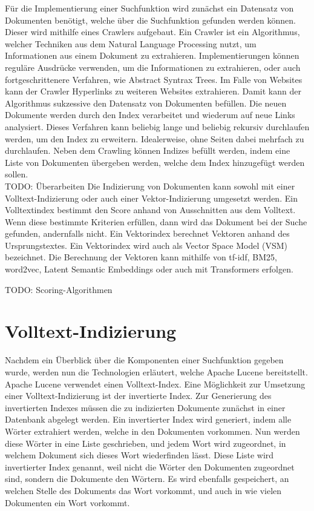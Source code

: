 Für die Implementierung einer Suchfunktion wird zunächst ein Datensatz von Dokumenten benötigt, welche über die Suchfunktion gefunden werden können.
Dieser wird mithilfe eines Crawlers aufgebaut.
Ein Crawler ist ein Algorithmus, welcher Techniken aus dem Natural Language Processing nutzt, um Informationen aus einem Dokument zu extrahieren.\cite{Khder_2021}
Implementierungen können reguläre Ausdrücke verwenden, um die Informationen zu extrahieren, oder auch fortgeschrittenere Verfahren, wie Abstract Syntrax Trees.
Im Falle von Websites kann der Crawler Hyperlinks zu weiteren Websites extrahieren.
Damit kann der Algorithmus sukzessive den Datensatz von Dokumenten befüllen.
Die neuen Dokumente werden durch den Index verarbeitet und wiederum auf neue Links analysiert.
Dieses Verfahren kann beliebig lange und beliebig rekursiv durchlaufen werden, um den Index zu erweitern.
Idealerweise, ohne Seiten dabei mehrfach zu durchlaufen.
Neben dem Crawling können Indizes befüllt werden, indem eine Liste von Dokumenten übergeben werden, welche dem Index hinzugefügt werden sollen.\\

TODO: Überarbeiten
Die Indizierung von Dokumenten kann sowohl mit einer Volltext-Indizierung oder auch einer Vektor-Indizierung umgesetzt werden.
Ein Volltextindex bestimmt den Score anhand von Ausschnitten aus dem Volltext.
Wenn diese bestimmte Kriterien erfüllen, dann wird das Dokument bei der Suche gefunden, andernfalls nicht.
Ein Vektorindex berechnet Vektoren anhand des Ursprungstextes.
Ein Vektorindex wird auch als Vector Space Model (VSM) bezeichnet.
Die Berechnung der Vektoren kann mithilfe von tf-idf, BM25, word2vec, Latent Semantic Embeddings oder auch mit Transformers erfolgen.

TODO: Scoring-Algorithmen

\section{Volltext-Indizierung}
\label{chap:volltext-indizierung}
Nachdem ein Überblick über die Komponenten einer Suchfunktion gegeben wurde, werden nun die Technologien erläutert, welche Apache Lucene bereitstellt.
Apache Lucene verwendet einen Volltext-Index.
Eine Möglichkeit zur Umsetzung einer Volltext-Indizierung ist der invertierte Index.
Zur Generierung des invertierten Indexes müssen die zu indizierten Dokumente zunächst in einer Datenbank abgelegt werden.
Ein invertierter Index wird generiert, indem alle Wörter extrahiert werden, welche in den Dokumenten vorkommen.
Nun werden diese Wörter in eine Liste geschrieben, und jedem Wort wird zugeordnet, in welchem Dokument sich dieses Wort wiederfinden lässt.
Diese Liste wird invertierter Index genannt, weil nicht die Wörter den Dokumenten zugeordnet sind, sondern die Dokumente den Wörtern.
Es wird ebenfalls gespeichert, an welchen Stelle des Dokuments das Wort vorkommt, und auch in wie vielen Dokumenten ein Wort vorkommt.\\

